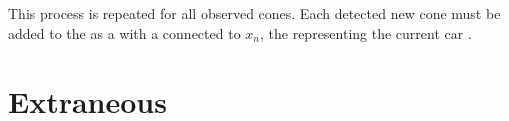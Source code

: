 \documentclass[letterpaper,10pt,english]{sphinxmanual}
\begin{document}

\sphinxAtStartPar
This process is repeated for all observed cones. Each detected new cone must be added to the {\hyperref[\detokenize{glossary:term-Factor-Graph}]{}} as a {\hyperref[\detokenize{glossary:term-Variable-Node}]{}} with a {\hyperref[\detokenize{glossary:term-Factor-Node}]{}} connected to \(x_{n}\), the {\hyperref[\detokenize{glossary:term-Variable-Node}]{}} representing the current car {\hyperref[\detokenize{glossary:term-Pose}]{}}.

\sphinxstepscope


\section{Extraneous}
\label{\detokenize{extraneous:extraneous}}\label{\detokenize{extraneous::doc}}
\end{document}
